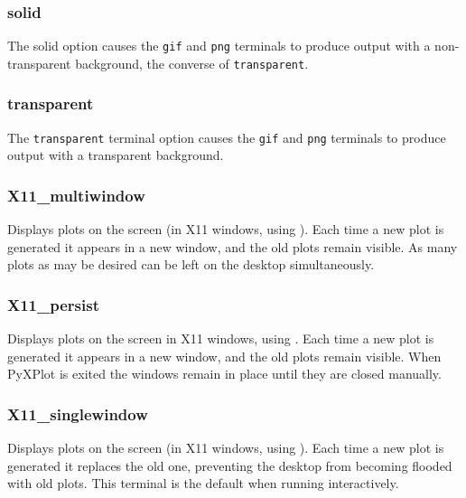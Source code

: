 \subsubsection{solid}

The solid option causes the {\tt gif} and {\tt png} terminals to produce output
with a non-transparent background, the converse of {\tt transparent}.


\subsubsection{transparent}

The {\tt transparent} terminal option causes the {\tt gif} and {\tt png}
terminals to produce output with a transparent background.


\subsubsection{X11\_multiwindow}

Displays plots on the screen (in X11 windows, using \ghostview). Each time a new
plot is generated it appears in a new window, and the old plots remain visible.
As many plots as may be desired can be left on the desktop simultaneously.

\subsubsection{X11\_persist}

Displays plots on the screen in X11 windows, using \ghostview.  Each time a new
plot is generated it appears in a new window, and the old plots remain visible.
When PyXPlot is exited the windows remain in place until they are closed
manually.

\subsubsection{X11\_singlewindow}

Displays plots on the screen (in X11 windows, using \ghostview). Each time a new
plot is generated it replaces the old one, preventing the desktop from becoming
flooded with old plots. This terminal is the default when running
interactively.

